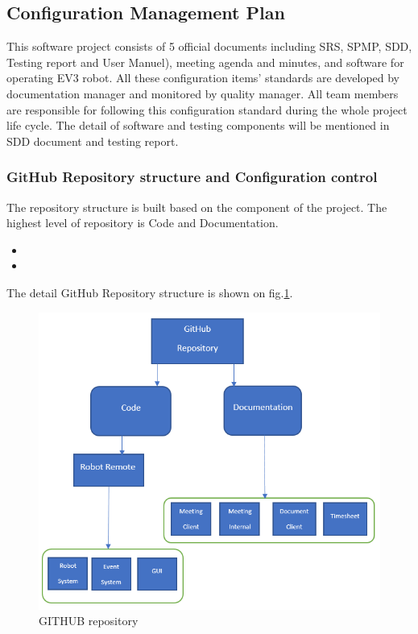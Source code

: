 \subsection{Configuration Management Plan}
This software project consists of 5 official documents including SRS, SPMP, SDD, Testing report and User Manuel), meeting agenda and minutes, and software for operating EV3 robot. All these configuration items’ standards are developed by documentation manager and monitored by quality manager. All team members are responsible for following this configuration standard during the whole project life cycle. The detail of software and testing components will be mentioned in SDD document and testing report.

\subsubsection{GitHub Repository structure and Configuration control}
The repository structure is built based on the component of the project. The highest level of repository is Code and Documentation. 
\begin{itemize}
	\item \texttt{}
	\item \texttt{}
\end{itemize}
The detail GitHub Repository structure is shown on fig.\ref{fig:GITHUB repository}.

\begin{figure}[H]
	\includegraphics[width=\linewidth]{GIT.PNG}  %
	\caption{GITHUB repository}
	\label{fig:GITHUB repository}				
\end{figure}

